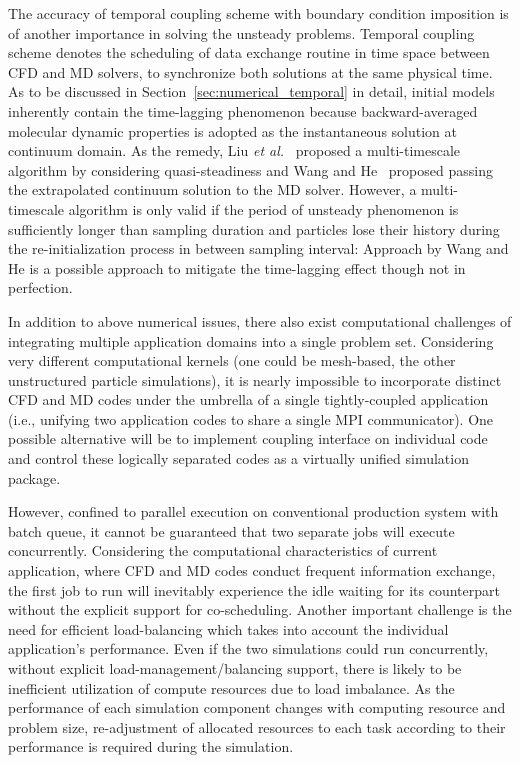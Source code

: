 \documentclass[preprint,12pt]{elsarticle}
\begin{document}
The accuracy of temporal coupling scheme with boundary condition imposition is of another importance in solving the unsteady problems. Temporal coupling scheme denotes the scheduling of data exchange routine in time space between CFD and MD solvers, to synchronize both solutions at the same physical time. As to be discussed in Section~\ref{sec:numerical_temporal} in detail, initial models inherently contain the time-lagging phenomenon because backward-averaged molecular dynamic properties 
is adopted as the instantaneous solution at continuum domain. As the remedy, Liu {\it{et al.}}~\cite{Liu} proposed a multi-timescale algorithm by considering quasi-steadiness and Wang and He~\cite{Wang} proposed passing the extrapolated continuum solution to the MD solver. However, a multi-timescale algorithm is only valid if the period of unsteady phenomenon is sufficiently longer than sampling duration and particles lose their history during the re-initialization process in between sampling interval: Approach by Wang and He is a possible approach to mitigate the time-lagging effect though not in perfection.


In addition to above numerical issues, there also exist computational challenges of integrating multiple application domains into a single problem set. Considering very different computational kernels (one could be mesh-based, the other unstructured particle simulations), it is nearly impossible to incorporate distinct CFD and MD codes under the umbrella of a single tightly-coupled application (i.e., unifying two application codes to share a single MPI communicator). One possible alternative will be to implement coupling interface on individual code and control these logically separated codes as a virtually unified simulation package.

However, confined to parallel execution on conventional production system with batch queue, it cannot be guaranteed that two separate jobs will execute concurrently. Considering the computational characteristics of current application, where CFD and MD codes conduct frequent information exchange, the first job to run will inevitably experience the idle waiting for its counterpart without the explicit support for co-scheduling. Another important challenge is the need for efficient load-balancing which takes into account the individual application's performance. Even if the two simulations could run concurrently, without explicit load-management/balancing support, there is likely to be inefficient utilization of compute resources due to load imbalance. As the performance of each simulation component changes with computing resource and problem size, re-adjustment of allocated resources to each task according to their performance is required during the simulation.
\end{document}
